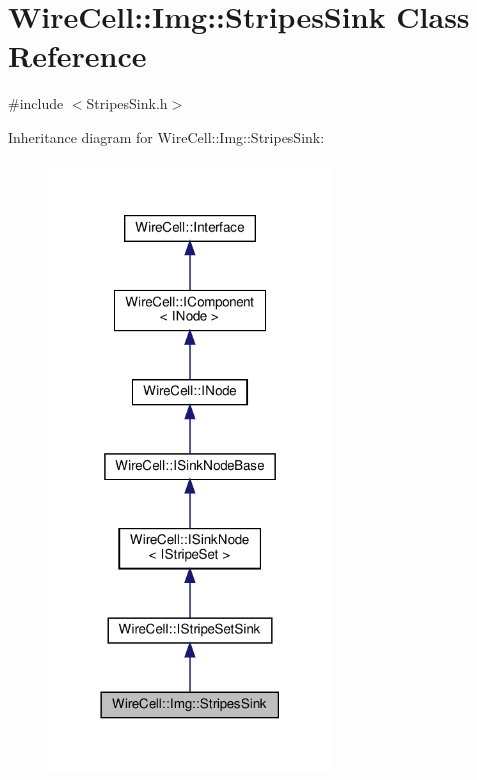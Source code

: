 \hypertarget{class_wire_cell_1_1_img_1_1_stripes_sink}{}\section{Wire\+Cell\+:\+:Img\+:\+:Stripes\+Sink Class Reference}
\label{class_wire_cell_1_1_img_1_1_stripes_sink}


{\ttfamily \#include $<$Stripes\+Sink.\+h$>$}



Inheritance diagram for Wire\+Cell\+:\+:Img\+:\+:Stripes\+Sink\+:
\nopagebreak
\begin{figure}[H]
\begin{center}
\leavevmode
\includegraphics[width=213pt]{class_wire_cell_1_1_img_1_1_stripes_sink__inherit__graph}
\end{center}
\end{figure}


